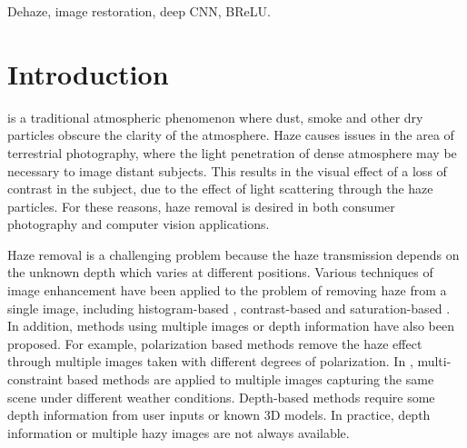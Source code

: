 \documentclass[journal]{IEEEtran}
\begin{document}
\begin{IEEEkeywords}
Dehaze, image restoration, deep CNN, BReLU.
\end{IEEEkeywords}

\IEEEpeerreviewmaketitle

\section{Introduction}\label{sec:Introduction}

 is a traditional atmospheric phenomenon where dust, smoke and other dry particles obscure the clarity of the atmosphere. Haze causes issues in the area of terrestrial photography, where the light penetration of dense atmosphere may be necessary to image distant subjects. This results in the visual effect of a loss of contrast in the subject, due to the effect of light scattering through the haze particles. For these reasons, haze removal is desired in both consumer photography and computer vision applications.

Haze removal is a challenging problem because the haze transmission depends on the unknown depth which varies at different positions. Various techniques of image enhancement have been applied to the problem of removing haze from a single image, including histogram-based \cite{histogram}, contrast-based \cite{contrast} and saturation-based \cite{saturation}. In addition, methods using multiple images or depth information have also been proposed. For example, polarization based methods \cite{polarization} remove the haze effect through multiple images taken with different degrees of polarization. In \cite{multiimage1}, multi-constraint based methods are applied to multiple images capturing the same scene under different weather conditions. Depth-based methods \cite{depth2} require some depth information from user inputs or known 3D models. In practice, depth information or multiple hazy images are not always available.
\end{document}

